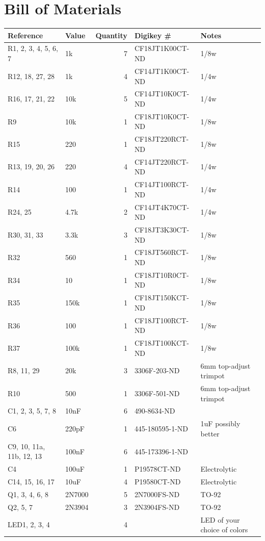 \documentclass[11pt]{article}
\begin{document}
\section{Bill of Materials}
\label{sec:org142e497}
\begin{center}
\begin{tabular}{llrll}
\textbf{Reference} & \textbf{Value} & \textbf{Quantity} & \textbf{Digikey \#} & \textbf{Notes}\\
\hline
R1, 2, 3, 4, 5, 6, 7 & 1k & 7 & CF18JT1K00CT-ND & 1/8w\\
R12, 18, 27, 28 & 1k & 4 & CF14JT1K00CT-ND & 1/4w\\
R16, 17, 21, 22 & 10k & 5 & CF14JT10K0CT-ND & 1/4w\\
R9 & 10k & 1 & CF18JT10K0CT-ND & 1/8w\\
R15 & 220 & 1 & CF18JT220RCT-ND & 1/8w\\
R13, 19, 20, 26 & 220 & 4 & CF14JT220RCT-ND & 1/4w\\
R14 & 100 & 1 & CF14JT100RCT-ND & 1/4w\\
R24, 25 & 4.7k & 2 & CF14JT4K70CT-ND & 1/4w\\
R30, 31, 33 & 3.3k & 3 & CF18JT3K30CT-ND & 1/8w\\
R32 & 560 & 1 & CF18JT560RCT-ND & 1/8w\\
R34 & 10 & 1 & CF18JT10R0CT-ND & 1/8w\\
R35 & 150k & 1 & CF18JT150KCT-ND & 1/8w\\
R36 & 100 & 1 & CF18JT100RCT-ND & 1/8w\\
R37 & 100k & 1 & CF18JT100KCT-ND & 1/8w\\
R8, 11, 29 & 20k & 3 & 3306F-203-ND & 6mm top-adjust trimpot\\
R10 & 500 & 1 & 3306F-501-ND & 6mm top-adjust trimpot\\
C1, 2, 3, 5, 7, 8 & 10nF & 6 & 490-8634-ND & \\
C6 & 220pF & 1 & 445-180595-1-ND & 1uF possibly better\\
C9, 10, 11a, 11b, 12, 13 & 100nF & 6 & 445-173396-1-ND & \\
C4 & 100uF & 1 & P19578CT-ND & Electrolytic\\
C14, 15, 16, 17 & 10uF & 4 & P19580CT-ND & Electrolytic\\
Q1, 3, 4, 6, 8 & 2N7000 & 5 & 2N7000FS-ND & TO-92\\
Q2, 5, 7 & 2N3904 & 3 & 2N3904FS-ND & TO-92\\
LED1, 2, 3, 4 &  & 4 &  & LED of your choice of colors\\

\end{tabular}
\end{center}
\end{document}
